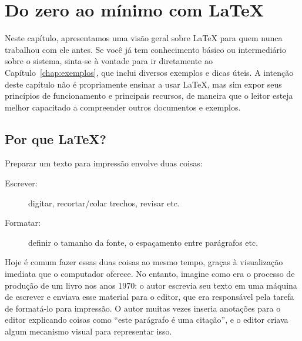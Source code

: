 

\newcommand{\sla}{\textbackslash}

\newcommand{\cmd}[1]{\textsf{#1}}

\newcommand{\pkg}[1]{\textsf{#1}}

\newcommand{\ltxcmd}[1]{\cmd{\sla{}#1}}

\chapter{Do zero ao mínimo com \LaTeX{}}
\label{chap:tutorial}

Neste capítulo, apresentamos uma visão geral sobre \LaTeX{} para quem
nunca trabalhou com ele antes. Se você já tem conhecimento básico ou
intermediário sobre o sistema, sinta-se à vontade para ir diretamente ao
Capítulo~\ref{chap:exemplos}, que inclui diversos exemplos e dicas úteis.
A intenção deste capítulo não é propriamente ensinar a usar \LaTeX{},
mas sim expor seus princípios de funcionamento e principais recursos,
de maneira que o leitor esteja melhor capacitado a compreender outros
documentos e exemplos.

\section{Por que \LaTeX{}?}

Preparar um texto para impressão envolve duas coisas:

\begin{description}
\item[Escrever:] digitar, recortar/colar trechos, revisar etc.
\item[Formatar:] definir o tamanho da fonte, o
espaçamento entre parágrafos etc.
\end{description}

Hoje é comum fazer essas duas coisas ao mesmo tempo, graças à visualização
imediata que o computador oferece. No entanto, imagine como era o processo de
produção de um livro nos anos 1970: o autor escrevia seu texto em uma máquina
de escrever e enviava esse material para o editor, que era responsável pela
tarefa de formatá-lo para impressão. O autor muitas vezes inseria anotações
para o editor explicando coisas como ``este parágrafo é uma citação'', e o
editor criava algum mecanismo visual para representar isso.

